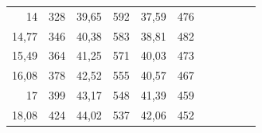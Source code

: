 \documentclass[a4paper,12pt]{article} %
\begin{document}
\begin{table}[]
\begin{tabular}{|rr|rr|rr|lrrll}
\multicolumn{1}{|r|}{14}            & 328                                  & \multicolumn{1}{r|}{39,65}         & 592                                  & \multicolumn{1}{r|}{37,59}         & 476                                  &                       & \multicolumn{1}{l}{}               & \multicolumn{1}{l}{}                 &                                    &                                      \\ \cline{1-6}
\multicolumn{1}{|r|}{14,77}         & 346                                  & \multicolumn{1}{r|}{40,38}         & 583                                  & \multicolumn{1}{r|}{38,81}         & 482                                  &                       & \multicolumn{1}{l}{}               & \multicolumn{1}{l}{}                 &                                    &                                      \\ \cline{1-6}
\multicolumn{1}{|r|}{15,49}         & 364                                  & \multicolumn{1}{r|}{41,25}         & 571                                  & \multicolumn{1}{r|}{40,03}         & 473                                  &                       & \multicolumn{1}{l}{}               & \multicolumn{1}{l}{}                 &                                    &                                      \\ \cline{1-6}
\multicolumn{1}{|r|}{16,08}         & 378                                  & \multicolumn{1}{r|}{42,52}         & 555                                  & \multicolumn{1}{r|}{40,57}         & 467                                  &                       & \multicolumn{1}{l}{}               & \multicolumn{1}{l}{}                 &                                    &                                      \\ \cline{1-6}
\multicolumn{1}{|r|}{17}            & 399                                  & \multicolumn{1}{r|}{43,17}         & 548                                  & \multicolumn{1}{r|}{41,39}         & 459                                  &                       & \multicolumn{1}{l}{}               & \multicolumn{1}{l}{}                 &                                    &                                      \\ \cline{1-6}
\multicolumn{1}{|r|}{18,08}         & 424                                  & \multicolumn{1}{r|}{44,02}         & 537                                  & \multicolumn{1}{r|}{42,06}         & 452                                  &                       & \multicolumn{1}{l}{}               & \multicolumn{1}{l}{}                 &                                    &                                      \\ \cline{1-6}

\end{tabular}
\end{table}
\end{document}
